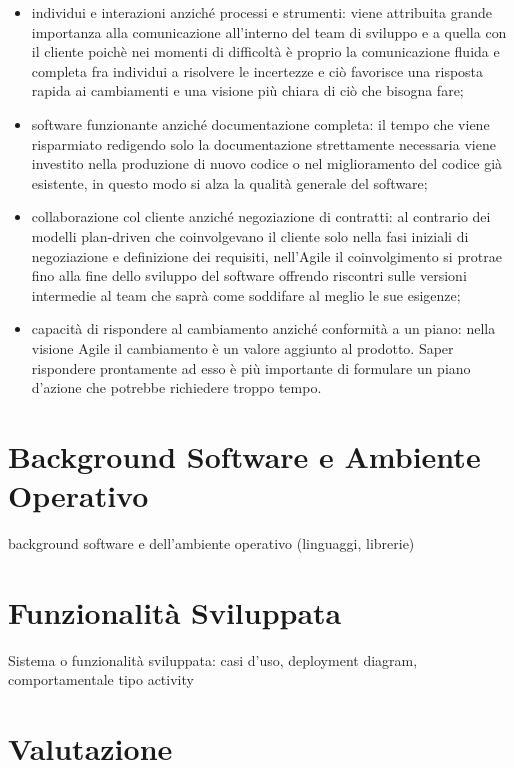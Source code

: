 \documentclass[target=bach,aauheader=,style=]{thud}
\begin{document}
\begin{itemize}
    \item individui e interazioni anziché processi e strumenti: viene attribuita grande importanza alla comunicazione all'interno del
    team di sviluppo e a quella con il cliente poichè nei momenti di difficoltà è proprio la comunicazione fluida e completa fra individui
    a risolvere le incertezze e ciò favorisce una risposta rapida ai cambiamenti e una visione più chiara di ciò che bisogna fare;
    \item software funzionante anziché documentazione completa: il tempo che viene risparmiato redigendo solo la documentazione strettamente
    necessaria viene investito nella produzione di nuovo codice o nel miglioramento del codice già esistente, in questo modo si alza
    la qualità generale del software;
    \item collaborazione col cliente anziché negoziazione di contratti: al contrario dei modelli plan-driven che coinvolgevano il cliente
    solo nella fasi iniziali di negoziazione e definizione dei requisiti, nell'Agile il coinvolgimento si protrae fino alla fine dello sviluppo
    del software offrendo riscontri sulle versioni intermedie al team che saprà come soddifare al meglio le sue esigenze;
    \item capacità di rispondere al cambiamento anziché conformità a un piano: nella visione Agile il cambiamento è un valore aggiunto al
    prodotto. Saper rispondere prontamente ad esso è più importante di formulare un piano d'azione che potrebbe richiedere troppo tempo.
\end{itemize}

\chapter{Background Software e Ambiente Operativo}

background software e dell'ambiente operativo (linguaggi, librerie)

\chapter{Funzionalità Sviluppata}

Sistema o funzionalità sviluppata: casi d'uso, deployment diagram, comportamentale tipo activity

\chapter{Valutazione}
\end{document}
